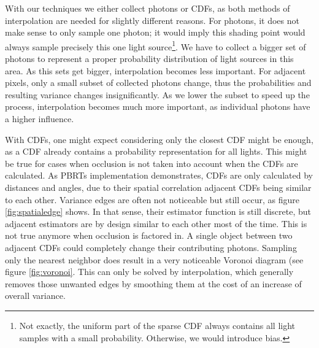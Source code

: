 With our techniques we either collect photons or CDFs, as both methods of interpolation are needed for slightly different reasons. For photons, it does not make sense to only sample one photon; it would imply this shading point would always sample precisely this one light source\footnote{Not exactly, the uniform part of the sparse CDF always contains all light samples with a small probability. Otherwise, we would introduce bias.}. We have to collect a bigger set of photons to represent a proper probability distribution of light sources in this area. As this sets get bigger, interpolation becomes less important. For adjacent pixels, only a small subset of collected photons change, thus the probabilities and resulting variance changes insignificantly. As we lower the subset to speed up the process, interpolation becomes much more important, as individual photons have a higher influence.

With CDFs, one might expect considering only the closest CDF might be enough, as a CDF already contains a probability representation for all lights. This might be true for cases when occlusion is not taken into account when the CDFs are calculated. As PBRTs implementation demonstrates, CDFs are only calculated by distances and angles, due to their spatial correlation adjacent CDFs being similar to each other. Variance edges are often not noticeable but still occur, as figure \ref{fig:spatialedge} shows. In that sense, their estimator function is still discrete, but adjacent estimators are by design similar to each other most of the time. This is not true anymore when occlusion is factored in. A single object between two adjacent CDFs could completely change their contributing photons. Sampling only the nearest neighbor does result in a very noticeable Voronoi diagram (see figure \ref{fig:voronoi}. This can only be solved by interpolation, which generally removes those unwanted edges by smoothing them at the cost of an increase of overall variance.

